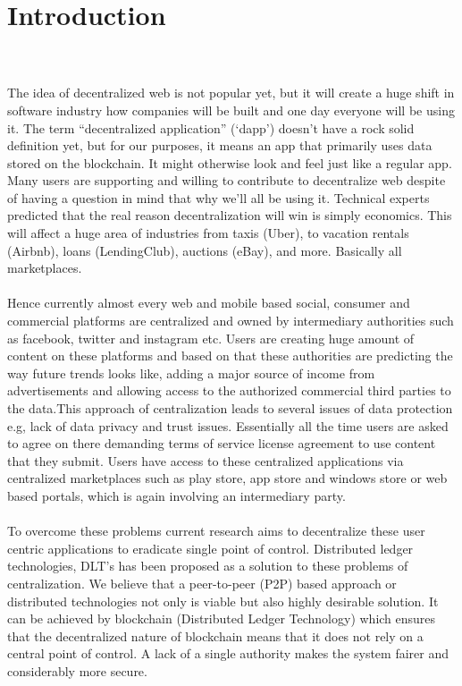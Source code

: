 \chapter{Introduction}
\label{cha:introduction}
\\
\\
The idea of decentralized web is not popular yet, but it will create a huge shift in software industry how companies will be built and one day everyone will be using it. The term “decentralized application” (‘dapp’) doesn’t have a rock solid definition yet, but for our purposes, it means an app that primarily uses data stored on the blockchain. It might otherwise look and feel just like a regular app. Many users are supporting and willing to contribute to decentralize web despite of having a question in mind that why we'll all be using it. Technical experts predicted that the real reason decentralization will win is simply economics. This will affect a huge area of industries from taxis (Uber), to vacation rentals (Airbnb), loans (LendingClub), auctions (eBay), and more. Basically all marketplaces.
\\
\\
Hence currently almost every web and mobile based social, consumer and commercial platforms are centralized and owned by intermediary authorities such as facebook, twitter and instagram etc. Users are creating huge amount of content on these platforms and based on that these authorities are predicting the way future trends looks like, adding a major source of income from advertisements and allowing access to the authorized commercial third parties to the data.This approach of centralization leads to several issues of data protection e.g, lack of data privacy and trust issues. Essentially all the time users are asked to agree on there demanding terms of service license agreement to use content that they submit. Users have access to these centralized applications via centralized marketplaces such as play store, app store and windows store or web based portals, which is again involving an intermediary party. 
\\
\\
To overcome these problems current research aims to decentralize these user centric applications to eradicate single point of control. Distributed ledger technologies, DLT's has been proposed as a solution to these problems of centralization. We believe that a peer-to-peer (P2P) based approach or distributed technologies not only is viable but also highly desirable solution. It can be achieved by blockchain (Distributed Ledger Technology) which ensures that the decentralized nature of blockchain means that it does not rely on a central point of control. A lack of a single authority makes the system fairer and considerably more secure.
